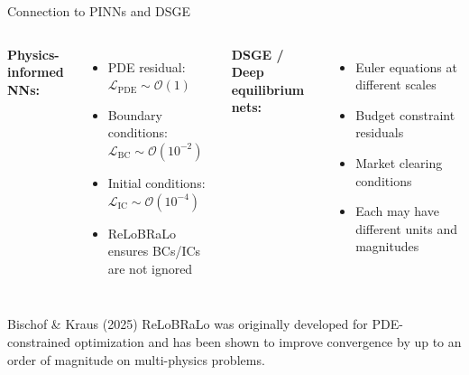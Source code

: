 \documentclass[aspectratio=169,11pt]{beamer}
\newcommand{\emphc}[1]{\textcolor{harvardcrimson}{#1}}
\begin{document}
\begin{frame}{Connection to PINNs and DSGE}
\begin{columns}[T]
\textbf{Physics-informed NNs:}
\begin{itemize}
    \item PDE residual: $\mathcal{L}_\text{PDE} \sim \mathcal{O}(1)$
    \item Boundary conditions: $\mathcal{L}_\text{BC} \sim \mathcal{O}(10^{-2})$
    \item Initial conditions: $\mathcal{L}_\text{IC} \sim \mathcal{O}(10^{-4})$
    \item ReLoBRaLo ensures BCs/ICs are \emphc{not ignored}
\end{itemize}

\textbf{DSGE / Deep equilibrium nets:}
\begin{itemize}
    \item Euler equations at different scales
    \item Budget constraint residuals
    \item Market clearing conditions
    \item Each may have different units and magnitudes
\end{itemize}
\end{columns}

\vspace{0.4cm}
\begin{block}{Bischof \& Kraus (2025)}
ReLoBRaLo was originally developed for PDE-constrained optimization and has been shown to improve convergence by up to an order of magnitude on multi-physics problems.
\end{block}
\end{frame}
\end{document}
